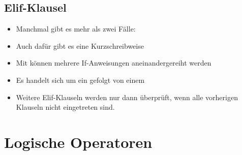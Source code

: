 \subsection{Elif-Klausel}

\begin{frame}
    \slidehead
    \begin{itemize}
        \item Manchmal gibt es mehr als zwei Fälle:
        \item Auch dafür gibt es eine Kurzschreibweise
    \end{itemize}
\end{frame}

\begin{frame}
    \slidehead

    \begin{itemize}
        \item Mit  können mehrere If-Anweisungen aneinandergereiht werden
        \item Es handelt sich um ein  gefolgt von einem 
        \item Weitere Elif-Klauseln werden nur dann überprüft, wenn alle vorherigen Klauseln nicht eingetreten sind.
    \end{itemize}
\end{frame}

\livecoding


\section{Logische Operatoren}


